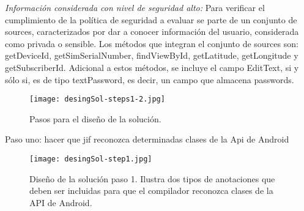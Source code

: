 \textit{Información considerada con nivel de seguridad alto:}\newline
Para verificar el cumplimiento de la política de seguridad a evaluar se parte de
un conjunto de sources, caracterizados por dar a conocer información del
usuario, considerada como privada o sensible. Los métodos que integran el
conjunto de sources son: getDeviceId, getSimSerialNumber, findViewById,
getLatitude, getLongitude y getSubscriberId. Adicional a estos métodos, se
incluye el campo EditText, si y sólo si, es de tipo textPassword, es decir, un
campo que almacena passwords.

\begin{figure}[h!]
	\begin{center}
	\texttt{[image: desingSol-steps1-2.jpg]}
	\end{center}
	\caption{Pasos para el diseño de la solución.}
	\label{fig:desingSol-steps1-2}
\end{figure}

Paso uno: hacer que jif reconozca determinadas clases de la Api de
Android\newline 

\begin{figure}[h!]
	\begin{center}
	\texttt{[image: desingSol-step1.jpg]}
	\end{center}
	\caption{Diseño de la solución paso 1. Ilustra dos tipos de anotaciones que
	deben ser incluidas para que el compilador reconozca clases de la API de
	Android.}
	\label{fig:desingSol-step1}
\end{figure}

